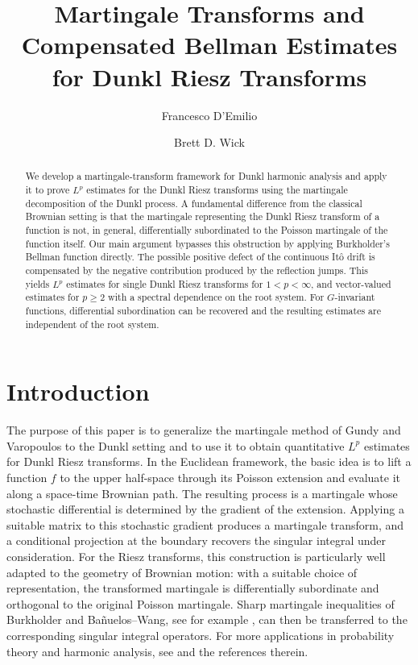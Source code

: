 \documentclass[11pt]{amsart}
\author{Francesco D'Emilio}
\author{Brett D. Wick}
\title{Martingale Transforms and Compensated Bellman Estimates for Dunkl Riesz Transforms}
\theoremstyle{definition}
\theoremstyle{remark}
\numberwithin{equation}{section}
\begin{document}
\begin{abstract}
We develop a martingale-transform framework for Dunkl harmonic analysis and apply it to prove $L^p$ estimates for the Dunkl Riesz transforms using the martingale decomposition of the Dunkl process. A fundamental difference from the classical Brownian setting is that the martingale representing the Dunkl Riesz transform of a function is not, in general, differentially subordinated to the Poisson martingale of the function itself. Our main argument bypasses this obstruction by applying Burkholder's Bellman function directly. The possible positive defect of the continuous It\^o drift is compensated by the negative contribution produced by the reflection jumps. This yields $L^p$ estimates for single Dunkl Riesz transforms for $1<p<\infty$, and vector-valued estimates for $p\geq2$ with a spectral dependence on the root system. For $G$-invariant functions, differential subordination can be recovered and the resulting estimates are independent of the root system.
\end{abstract}

\maketitle
\section{Introduction}

The purpose of this paper is to generalize the martingale method of Gundy and Varopoulos \cite{GV} to the Dunkl setting and to use it to obtain quantitative $L^p$ estimates for Dunkl Riesz transforms. In the Euclidean framework, the basic idea is to lift a function $f$ to the upper half-space through its Poisson extension and evaluate it along a space-time Brownian path. The resulting process is a martingale whose stochastic differential is determined by the gradient of the extension. Applying a suitable matrix to this stochastic gradient produces a martingale transform, and a conditional projection at the boundary recovers the singular integral under consideration. For the Riesz transforms, this construction is particularly well adapted to the geometry of Brownian motion: with a suitable choice of representation, the transformed martingale is differentially subordinate and orthogonal to the original Poisson martingale. Sharp martingale inequalities of Burkholder and Ba\~nuelos--Wang, see for example \cite{burk,bur88,BW95,BW96,W95}, can then be transferred to the corresponding singular integral operators. For more applications in probability theory and harmonic analysis, see \cite{Ban2,osekowski,dompet} and the references therein. \\
\end{document}
